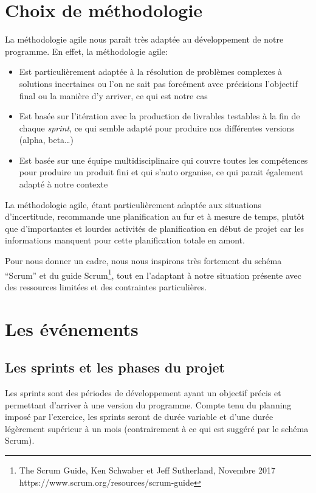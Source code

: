 \section{Choix de méthodologie}

La méthodologie agile nous paraît très adaptée au développement de notre programme.
En effet, la méthodologie agile:

\begin{itemize}
    \item  Est particulièrement adaptée à la résolution de problèmes complexes
          à solutions incertaines ou l’on ne sait pas forcément avec précisions l’objectif
          final ou la manière d’y arriver, ce qui est notre cas
    \item Est basée sur l'itération avec la production de livrables testables
          à la fin de chaque \emph{sprint}, ce qui semble adapté pour produire nos différentes
          versions (alpha, beta…)
    \item Est basée sur une équipe multidisciplinaire qui couvre toutes les compétences
          pour produire un produit fini et qui s’auto organise, ce qui parait également
          adapté à notre contexte
\end{itemize}

La méthodologie agile, étant particulièrement adaptée aux situations d'incertitude, recommande
une planification au fur et à mesure de temps, plutôt que d’importantes et lourdes activités de 
planification en début de projet car les informations manquent pour cette planification totale en amont.

Pour nous donner un cadre, nous nous inspirons très fortement du schéma “Scrum” et du guide 
Scrum\footnote{The Scrum Guide, Ken Schwaber et Jeff Sutherland, Novembre 2017 https://www.scrum.org/resources/scrum-guide}, 
tout en l’adaptant à notre situation présente avec des ressources limitées et des contraintes particulières.

\section{Les événements}

\subsection{Les sprints et les phases du projet}


Les sprints sont des périodes de développement ayant un objectif précis et permettant d'arriver à 
une version du programme. 
Compte tenu du planning imposé par l’exercice, les sprints seront de durée variable et d'une durée légèrement supérieur à un 
mois (contrairement à ce qui est suggéré par le schéma Scrum).\\

